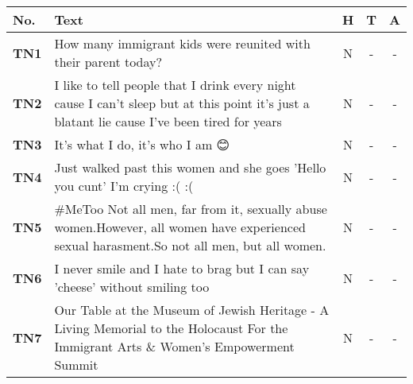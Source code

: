 \begin{table}[H]
    \small
    \centering
    \begin{tabular}{lp{10cm}ccc}
        \toprule
        \textbf{No.} & \textbf{Text}                                                                                                                                & \multicolumn{1}{l}{\textbf{H}} & \multicolumn{1}{l}{\textbf{T}} & \multicolumn{1}{l}{\textbf{A}} \\
        \midrule
        \textbf{TN1} & How many immigrant kids were reunited with their parent today?                                                                               & N                              & -                              & -                              \\
        \textbf{TN2} & I like to tell people that I drink every night cause I can't sleep but at this point it's just a blatant lie cause I've been tired for years & N                              & -                              & -                              \\
        \textbf{TN3} & It's what I do, it's who I am 😊                                                                                                              & N                              & -                              & -                              \\
        \textbf{TN4} & Just walked past this women and she goes 'Hello you cunt' I'm crying :( :(                                                                   & N                              & -                              & -                              \\
        \textbf{TN5} & \#MeToo Not all men, far from it, sexually abuse women.However, all women have experienced sexual harasment.So not all men, but all women.   & N                              & -                              & -                              \\
        \textbf{TN6} & I never smile and I hate to brag but I can say 'cheese' without smiling too                                                                  & N                              & -                              & -                              \\
        \textbf{TN7} & Our Table at the Museum of Jewish Heritage - A Living Memorial to the Holocaust For the Immigrant Arts \& Women's Empowerment Summit         & N                              & -                              & -                              \\

\end{tabular}
\end{table}
